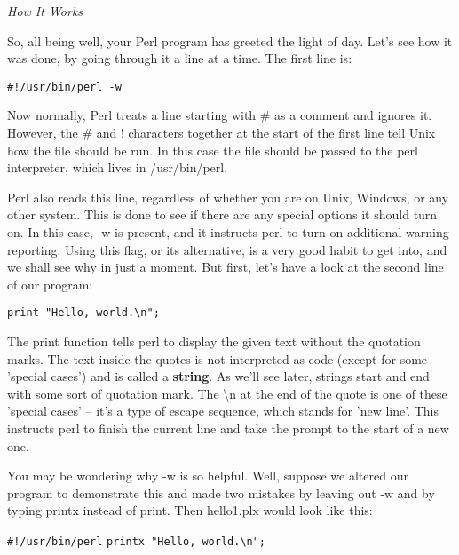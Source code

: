 \documentclass[a4paper,11pt]{book}
\begin{document}
\noindent 

\noindent \textit{How It Works}

\noindent So, all being well, your Perl program has greeted the light of day. Let's see how it was done, by going through it a line at a time. The first line is:

\noindent 

\noindent \texttt{\#!/usr/bin/perl -w}

\noindent 

\noindent Now normally, Perl treats a line starting with \# as a comment and ignores it. However, the \# and ! characters together at the start of the first line tell Unix how the file should be run. In this case the file should be passed to the perl interpreter, which lives in /usr/bin/perl.

\noindent 

\noindent Perl also reads this line, regardless of whether you are on Unix, Windows, or any other system. This is done to see if there are any special options it should turn on. In this case, -w is present, and it instructs perl to turn on additional warning reporting. Using this flag, or its alternative, is a very good habit to get into, and we shall see why in just a moment. But first, let's have a look at the second line of our program:

\noindent 

\noindent \texttt{print "Hello, world.\textbackslash n";}

\noindent 

\noindent The print function tells perl to display the given text without the quotation marks. The text inside the quotes is not interpreted as code (except for some 'special cases') and is called a \textbf{string}. As we'll see later, strings start and end with some sort of quotation mark. The \textbackslash n at the end of the quote is one of these 'special cases' -- it's a type of escape sequence, which stands for 'new line'. This instructs perl to finish the current line and take the prompt to the start of a new one.

\noindent 

\noindent You may be wondering why -w is so helpful.  Well, suppose we altered our program to demonstrate this and made two mistakes by leaving out -w and by typing printx instead of print. Then hello1.plx would look like this:

\noindent 

\noindent \texttt{\#!/usr/bin/perl}
\noindent \texttt{printx "Hello, world.\textbackslash n";}
\end{document}
